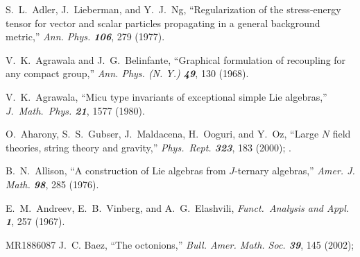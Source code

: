  S.~L.~Adler, J.~Lieberman, and Y.~J.~Ng,
``Regularization of the stress-energy tensor for vector and scalar particles
propagating in a general background metric,''
{\em Ann. Phys. \bf 106}, 279 (1977).

V.~K.~Agrawala and J.~G.~Belinfante,
``Graphical formulation of recoupling for any compact group,''
{\em Ann.  Phys.  (N. Y.) \bf 49}, 130 (1968).

V.~K.~Agrawala,
``Micu type invariants of exceptional simple Lie algebras,''
{\em J.~Math.~Phys.  \bf 21}, 1577 (1980).

O.~Aharony, S.~S.~Gubser, J.~Maldacena, H.~Ooguri, and Y.~Oz,
``Large $N$ field theories, string theory and gravity,''
{\em Phys.~Rept.  \bf 323}, 183 (2000);
.


 B.~N.~Allison,
        ``A construction of Lie algebras from $J$-ternary algebras,''
        {\em Amer. J. Math. \bf 98}, 285 (1976).  %

    E.~M.~Andreev, E.~B.~Vinberg, and A.~G.~Elashvili,
    {\em Funct.~Analysis and Appl.  \bf 1}, 257 (1967).

%



        {MR1886087} J.~C. Baez,
    ``The octonions,''
    {\em Bull. Amer. Math. Soc.  \bf 39}, 145 (2002); %


